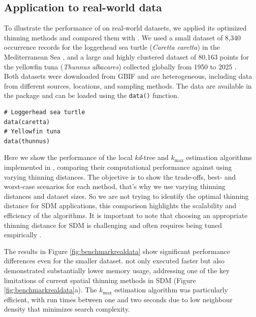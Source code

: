 \subsection{Application to real-world data}\label{benchreal}

To illustrate the performance of  on real-world datasets, we applied its optimized thinning methods and compared them with . We used a small dataset of 8,340 occurrence records for the loggerhead sea turtle (\emph{Caretta caretta}) in the Mediterranean Sea \citep{GBIFCaretta}, and a large and highly clustered dataset of 80,163 points for the yellowfin tuna (\emph{Thunnus albacares}) collected globally from 1950 to 2025 \citep{GBIFThunnus}. Both datasets were downloaded from GBIF \citep{GBIF} and are heterogeneous, including data from different sources, locations, and sampling methods. The data are available in the  package and can be loaded using the \texttt{data()} function.

\begin{verbatim}
# Loggerhead sea turtle
data(caretta)
# Yellowfin tuna
data(thunnus)
\end{verbatim}

Here we show the performance of the local \emph{kd}-tree and \(k_\text{max}\) estimation algorithms implemented in , comparing their computational performance against  using varying thinning distances. The objective is to show the trade-offs, best- and worst-case scenarios for each method, that's why we use varying thinning distances and dataset sizes. So we are not trying to identify the optimal thinning distance for SDM applications, this comparison highlights the scalability and efficiency of the algorithms. It is important to note that choosing an appropriate thinning distance for SDM is challenging and often requires being tuned empirically \citep{veloz2009spatially, soley2019sufficient}.

The results in Figure \ref{fig:benchmarkrealdata} show significant performance differences even for the smaller dataset.  not only executed faster but also demonstrated substantially lower memory usage, addressing one of the key limitations of current spatial thinning methods in SDM (Figure \ref{fig:benchmarkrealdata}a). The \(k_\text{max}\) estimation algorithm was particularly efficient, with run times between one and two seconds due to low neighbour density that minimizes search complexity.

